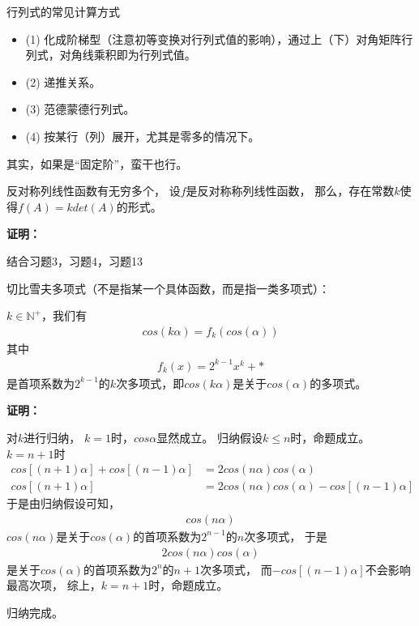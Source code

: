 \documentclass{article}
\begin{document}
\begin{zremark}
  行列式的常见计算方式
\end{zremark}

\begin{itemize}
  \item (1) 化成阶梯型（注意初等变换对行列式值的影响），通过上（下）对角矩阵行列式，对角线乘积即为行列式值。
  \item (2) 递推关系。
  \item (3) 范德蒙德行列式。
  \item (4) 按某行（列）展开，尤其是零多的情况下。
\end{itemize}

其实，如果是“固定阶”，蛮干也行。

\begin{zremark}
  反对称列线性函数有无穷多个，
  设$f$是反对称称列线性函数，
  那么，存在常数$k$使得$f (A) = k det(A)$的形式。
\end{zremark}

\textbf{证明：}

结合习题3，习题4，习题13

\begin{zremark}
  切比雪夫多项式（不是指某一个具体函数，而是指一类多项式）：

  $k \in \mathbb{N}^{+}$，我们有
  \begin{align*}
    cos(k \alpha) = f_k (cos(\alpha))
  \end{align*}
  其中
  \begin{align*}
    f_k (x) = 2^{k - 1} x^k + *
  \end{align*}
  是首项系数为$2^{k - 1}$的$k$次多项式，即$cos(k \alpha)$是关于$cos(\alpha)$的多项式。
\end{zremark}

\textbf{证明：}

对$k$进行归纳，
$k = 1$时，$cos \alpha$显然成立。
归纳假设$k \leq n$时，命题成立。
$k = n+1$时
\begin{align*}
  cos[(n + 1)\alpha] + cos [(n - 1)\alpha]
                     & = 2 cos(n \alpha)cos(\alpha)                       \\
  cos[(n + 1)\alpha] & = 2 cos(n \alpha)cos(\alpha) - cos [(n - 1)\alpha]
\end{align*}
于是由归纳假设可知，
\begin{align*}
  cos(n \alpha)
\end{align*}
$cos(n \alpha)$是关于$cos(\alpha)$的首项系数为$2^{n - 1}$的$n$次多项式，
于是
\begin{align*}
  2 cos(n \alpha)cos(\alpha)
\end{align*}
是关于$cos(\alpha)$的首项系数为$2^{n}$的$n+1$次多项式，
而$ - cos [(n - 1)\alpha]$不会影响最高次项，
综上，$k = n + 1$时，命题成立。

归纳完成。
\end{document}
